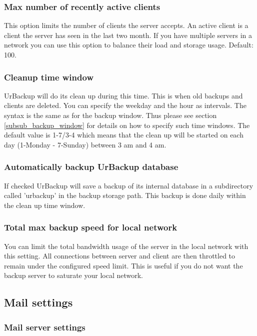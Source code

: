 \documentclass[a4paper,10pt]{article} \usepackage[breaklinks=true]{hyperref}
\begin{document}
\subsubsection{Max number of recently active clients}

This option limits the number of clients the server accepts. An active client is
a client the server has seen in the last two month. If you have multiple servers
in a network you can use this option to balance their load and storage usage.
Default: 100.

\subsubsection{Cleanup time window}

UrBackup will do its clean up during this time. This is when old backups and
clients are deleted. You can specify the weekday and the hour as intervals. The
syntax is the same as for the backup window. Thus please see section
\ref{subsub_backup_window} for details on how to specify such time windows.
The default value is 1-7/3-4 which means that the clean up will be started on
each day (1-Monday - 7-Sunday) between 3 am and 4 am.

\subsubsection{Automatically backup UrBackup database}

If checked UrBackup will save a backup of its internal database in a
subdirectory called 'urbackup' in the backup storage path. This backup is done
daily within the clean up time window.

\subsubsection{Total max backup speed for local network}

You can limit the total bandwidth usage of the server in the local network
with this setting. All connections between server and client are then throttled
to remain under the configured speed limit. This is useful if you do not want
the backup server to saturate your local network. 

\subsection{Mail settings}

\subsubsection{Mail server settings}
\end{document}
